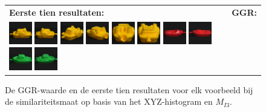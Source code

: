 \begin{figure}[tbp]
\caption{\label{fig:results_xyz_histgeb}De GGR-waarde en de eerste tien resultaten voor elk voorbeeld bij de similariteitsmaat op basis van het XYZ-histogram en $M_{I3}$.}
\vspace{5pt}
\centering
\begin{tabular}{m{11cm} | m{3cm} |}
\textbf{Eerste tien resultaten:} & \textbf{GGR:} \\
\vspace{4pt}
\includegraphics[width=1cm]{coil/beeld-12.eps}
\includegraphics[width=1cm]{coil/beeld-13.eps}
\includegraphics[width=1cm]{coil/beeld-15.eps}
\includegraphics[width=1cm]{coil/beeld-16.eps}
\includegraphics[width=1cm]{coil/beeld-17.eps}
\includegraphics[width=1cm]{coil/beeld-14.eps}
\includegraphics[width=1cm]{coil/beeld-19.eps}
\includegraphics[width=1cm]{coil/beeld-18.eps}
\includegraphics[width=1cm]{coil/beeld-54.eps}
\includegraphics[width=1cm]{coil/beeld-55.eps}

\end{tabular}
\end{figure}
